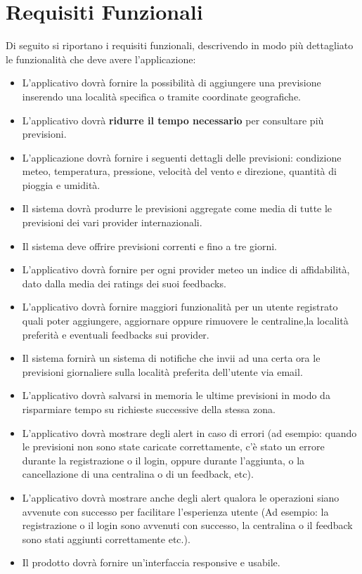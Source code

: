 	\section{Requisiti Funzionali} %
	Di seguito si riportano i requisiti funzionali, descrivendo in modo più dettagliato le funzionalità che deve avere l'applicazione:
	 \begin{itemize}
	 \item L'applicativo dovrà fornire la possibilità di aggiungere una previsione inserendo una località specifica o tramite coordinate geografiche.
	\item L'applicativo dovrà \textbf{ridurre il tempo necessario} per consultare più previsioni.
	\item L'applicazione dovrà fornire i seguenti dettagli delle previsioni: condizione meteo, temperatura, pressione, velocità del vento e direzione, quantità di pioggia e umidità.
	\item Il sistema dovrà produrre le previsioni aggregate come media di tutte le previsioni dei vari provider internazionali.
	\item Il sistema deve offrire previsioni correnti e fino a tre giorni.
	\item L'applicativo dovrà fornire per ogni provider meteo un indice di affidabilità, dato dalla media dei ratings dei suoi feedbacks.
	\item L'applicativo dovrà fornire maggiori funzionalità per un utente registrato quali poter aggiungere, aggiornare oppure rimuovere le centraline,la località preferità e eventuali feedbacks sui provider.
	\item Il sistema fornirà un sistema di notifiche che invii ad una certa ora le previsioni giornaliere sulla località preferita dell'utente via email.
	\item L'applicativo dovrà salvarsi in memoria le ultime previsioni in modo da risparmiare tempo su richieste successive della stessa zona. 
	\item L'applicativo dovrà mostrare degli alert in caso di errori (ad esempio: quando le previsioni non sono state caricate correttamente, c'è stato un errore durante la registrazione o il login, oppure durante l'aggiunta, o la cancellazione di una centralina o di un feedback, etc).
	\item L'applicativo dovrà mostrare anche degli alert qualora le operazioni siano avvenute con successo per facilitare l'esperienza utente (Ad esempio: la registrazione o il login sono avvenuti con successo, la centralina o il feedback sono stati aggiunti correttamente etc.).
	\item Il prodotto dovrà fornire un'interfaccia responsive e usabile.
	\end{itemize}
